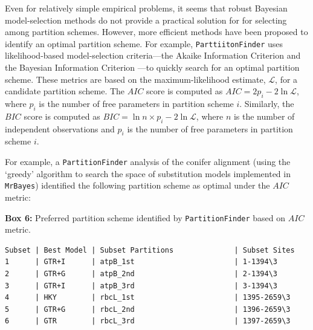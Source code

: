 \documentclass[11pt]{article}
\begin{document}
Even for relatively simple empirical problems, it seems that robust Bayesian model-selection methods \citep[{\it e.g.},][]{xie11, fan11} do not provide a practical solution for %
for selecting among partition schemes.
However, more efficient methods have been proposed to identify an optimal partition scheme.
For example, \verb!ParttiitonFinder! \cite[][]{Lanfear2012} uses likelihood-based model-selection criteria---the Akaike Information Criterion \citep[$AIC$; ][]{akaike1974} and the Bayesian Information Criterion \citep[$BIC$; ][]{kass95}---to quickly search for an optimal partition scheme.
These metrics are based on the maximum-likelihood estimate, $\mathcal{L}$, for a candidate partition scheme.
The $AIC$ score is computed as $AIC = 2p_i-2\ln\mathcal{L}$, where $p_i$ is the number of free parameters in partition scheme $i$.
Similarly, the $BIC$ score is computed as $BIC = \ln n \times p_i - 2\ln\mathcal{L}$, where $n$ is the number of independent observations and $p_i$ is the number of free parameters in partition scheme $i$.

For example, a \verb!PartitionFinder! analysis of the conifer alignment (using the `greedy' algorithm to search the space of substitution models implemented in \verb!MrBayes!) identified the following partition scheme as optimal under the $AIC$ metric:

\begin{center}
{\bf Box 6:} Preferred partition scheme identified by \verb!PartitionFinder! based on $AIC$ metric. \\
\end{center}
{\tt \scriptsize \begin{framed}
\begin{lstlisting}
Subset | Best Model | Subset Partitions              | Subset Sites
1      | GTR+I      | atpB_1st                       | 1-1394\3    
2      | GTR+G      | atpB_2nd                       | 2-1394\3    
3      | GTR+I      | atpB_3rd                       | 3-1394\3    
4      | HKY        | rbcL_1st                       | 1395-2659\3 
5      | GTR+G      | rbcL_2nd                       | 1396-2659\3 
6      | GTR        | rbcL_3rd                       | 1397-2659\3 
\end{lstlisting}
\end{framed}}
\end{document}
